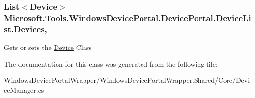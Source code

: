 \subsubsection[{\texorpdfstring{Devices}{Devices}}]{\setlength{\rightskip}{0pt plus 5cm}List$<${\bf Device}$>$ Microsoft.\+Tools.\+Windows\+Device\+Portal.\+Device\+Portal.\+Device\+List.\+Devices\hspace{0.3cm}{\ttfamily [get]}, {\ttfamily [set]}}\hypertarget{class_microsoft_1_1_tools_1_1_windows_device_portal_1_1_device_portal_1_1_device_list_a08da5165aa55ca37e9324c10517d5045}{}\label{class_microsoft_1_1_tools_1_1_windows_device_portal_1_1_device_portal_1_1_device_list_a08da5165aa55ca37e9324c10517d5045}


Gets or sets the \hyperlink{class_microsoft_1_1_tools_1_1_windows_device_portal_1_1_device_portal_1_1_device}{Device} Class 



The documentation for this class was generated from the following file\+:\begin{DoxyCompactItemize}
\item 
Windows\+Device\+Portal\+Wrapper/\+Windows\+Device\+Portal\+Wrapper.\+Shared/\+Core/Device\+Manager.\+cs\end{DoxyCompactItemize}
